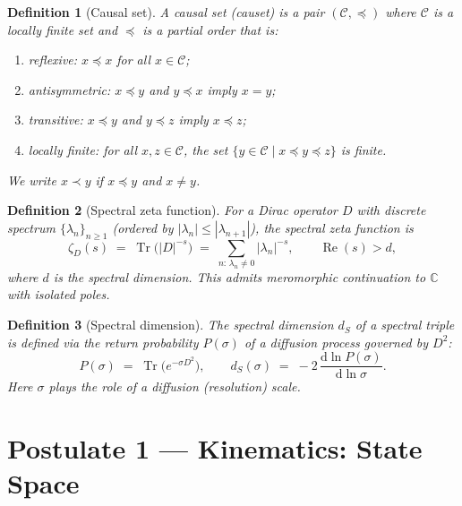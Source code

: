 \documentclass[12pt,a4paper]{article}
\theoremstyle{postulate}
\newtheorem{definition}{Definition}[section]
\newcommand{\Tr}{\operatorname{Tr}}
\newcommand{\Dirac}{D}
\newcommand{\Causal}{\mathcal{C}}
\newcommand{\dd}{\mathrm{d}}
\newcommand{\zetaD}{\zeta_{\Dirac}}
\begin{document}
\begin{definition}[Causal set]\label{def:causet}
A \emph{causal set} (causet) is a pair $(\Causal, \preceq)$ where $\Causal$
is a locally finite set and $\preceq$ is a partial order that is:
\begin{enumerate}[label=(\roman*)]
  \item \emph{reflexive}: $x \preceq x$ for all $x \in \Causal$;
  \item \emph{antisymmetric}: $x \preceq y$ and $y \preceq x$ imply $x = y$;
  \item \emph{transitive}: $x \preceq y$ and $y \preceq z$ imply $x \preceq z$;
  \item \emph{locally finite}: for all $x, z \in \Causal$, the set
        $\{y \in \Causal \mid x \preceq y \preceq z\}$ is finite.
\end{enumerate}
We write $x \prec y$ if $x \preceq y$ and $x \neq y$.
\end{definition}

\begin{definition}[Spectral zeta function]\label{def:zeta}
For a Dirac operator $\Dirac$ with discrete spectrum
$\{\lambda_n\}_{n \geq 1}$ (ordered by $|\lambda_n| \leq |\lambda_{n+1}|$),
the \emph{spectral zeta function} is
\begin{equation}\label{eq:zeta-def}
  \zetaD(s) \;=\; \Tr\bigl(|\Dirac|^{-s}\bigr)
             \;=\; \sum_{n:\,\lambda_n \neq 0} |\lambda_n|^{-s},
  \qquad \operatorname{Re}(s) > d,
\end{equation}
where $d$ is the spectral dimension.  This admits meromorphic continuation to
$\mathbb{C}$ with isolated poles.
\end{definition}

\begin{definition}[Spectral dimension]\label{def:spec-dim}
The \emph{spectral dimension} $d_S$ of a spectral triple is defined via the
return probability $P(\sigma)$ of a diffusion process governed by $\Dirac^2$:
\begin{equation}\label{eq:spec-dim}
  P(\sigma) \;=\; \Tr\bigl(e^{-\sigma \Dirac^2}\bigr),
  \qquad
  d_S(\sigma) \;=\; -2\,\frac{\dd \ln P(\sigma)}{\dd \ln \sigma}.
\end{equation}
Here $\sigma$ plays the role of a diffusion (resolution) scale.
\end{definition}


\section{Postulate 1 --- Kinematics: State Space}\label{sec:P1}
\end{document}
